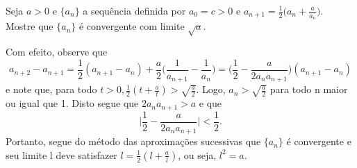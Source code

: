 \documentclass[analysis_notes.tex]{subfiles}
\begin{document}
\begin{example}
	Seja $a > 0$ e $\{a_{n}\}$ a sequ\^encia definida por $a_{0} = c > 0$ e $a_{n+1}=\displaystyle \frac{1}{2}\biggl(a_{n} + \frac{a}{a_{n}}\biggr)$. Mostre que
	$\{a_{n}\}$ \'e convergente com limite $\sqrt{a}$.

	Com efeito, observe que
	$$
		a_{n+2} - a_{n+1} = \frac{1}{2}(a_{n+1}-a_{n}) + \frac{a}{2}\biggl(\frac{1}{a_{n+1}}-\frac{1}{a_{n}}\biggr) = \biggl(\frac{1}{2} - \frac{a}{2a_{n}a_{n+1}}\biggr)(a_{n+1}-a_{n})
	$$
	e note que, para todo $t > 0, \frac{1}{2}(t + \frac{a}{t}) > \sqrt{\frac{a}{2}}.$ Logo, $a_{n} > \sqrt{\frac{a}{2}}$ para todo n maior ou igual que 1.
	Disto segue que $2a_{n}a_{n+1} > a$ e que
	$$
		\biggl|\frac{1}{2} - \frac{a}{2a_{n}a_{n+1}}\biggr| < \frac{1}{2}.
	$$
	Portanto, segue do m\'etodo das aproxima\c c\~oes sucessivas que $\{a_{n}\}$ \'e convergente e seu limite l deve satisfazer
	$l = \frac{1}{2}(l + \frac{a}{l})$, ou seja, $l^{2} = a.$ \qedsymbol
\end{example}
\end{document}
